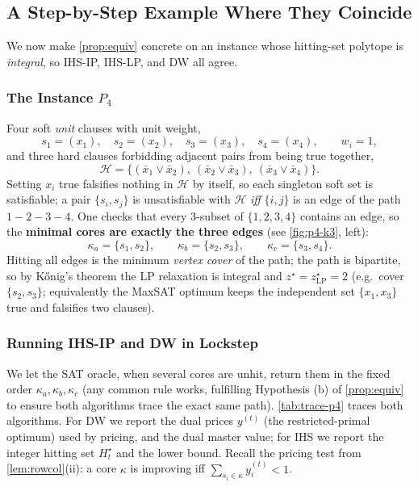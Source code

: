 \subsection{A Step-by-Step Example Where They Coincide}
\label{sec:worked}

We now make \cref{prop:equiv} concrete on an instance whose
hitting-set polytope is \emph{integral}, so IHS-IP, IHS-LP, and DW all agree.

\subsubsection{The Instance \texorpdfstring{$P_4$}{P4}}

Four soft \emph{unit} clauses with unit weight,
\[
s_1=(x_1),\quad s_2=(x_2),\quad s_3=(x_3),\quad s_4=(x_4),\qquad w_i = 1,
\]
and three hard clauses forbidding adjacent pairs from being true together,
\[
\mathcal{H} = \{(\bar x_1 \vee \bar x_2),\ (\bar x_2 \vee \bar x_3),\ (\bar x_3 \vee \bar x_4)\}.
\]
Setting $x_i$ true falsifies nothing in $\mathcal{H}$ by itself, so each
singleton soft set is satisfiable; a pair $\{s_i,s_j\}$ is unsatisfiable with
$\mathcal{H}$ \emph{iff} $\{i,j\}$ is an edge of the path $1{-}2{-}3{-}4$. One
checks that every $3$-subset of $\{1,2,3,4\}$ contains an edge, so the
\textbf{minimal cores are exactly the three edges} (see \cref{fig:p4-k3},
left):
\[
\kappa_a = \{s_1,s_2\},\qquad \kappa_b = \{s_2,s_3\},\qquad \kappa_c = \{s_3,s_4\}.
\]
Hitting all edges is the minimum \emph{vertex cover} of the path; the path is
bipartite, so by K\H{o}nig's theorem the LP relaxation is integral and
$z^\star = z^\star_{\mathrm{LP}} = 2$ (e.g.\ cover $\{s_2,s_3\}$; equivalently
the MaxSAT optimum keeps the independent set $\{x_1,x_3\}$ true and falsifies
two clauses).

\subsubsection{Running IHS-IP and DW in Lockstep}

We let the SAT oracle, when several cores are unhit, return them in the fixed
order $\kappa_a, \kappa_b, \kappa_c$ (any common rule works, fulfilling Hypothesis (b)
of \cref{prop:equiv} to ensure both algorithms trace the exact same path). \cref{tab:trace-p4}
traces both algorithms. For DW we report the dual prices $y^{(t)}$ (the
restricted-primal optimum) used by pricing, and the dual master value; for
IHS we report the integer hitting set $H_t^\star$ and the lower bound. Recall
the pricing test from \cref{lem:rowcol}(ii): a core $\kappa$ is improving
iff $\sum_{s_i\in\kappa} y^{(t)}_i < 1$.

